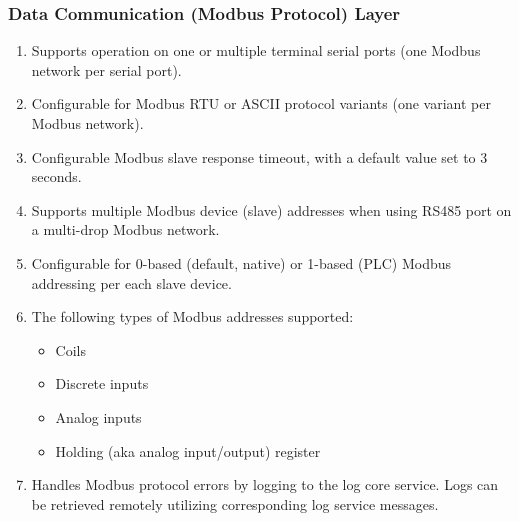 \documentclass[letterpaper,10pt,english]{sphinxmanual}
\begin{document}
\subsubsection{Data Communication (Modbus Protocol) Layer}
\label{\detokenize{funcspec:data-communication-modbus-protocol-layer}}\begin{enumerate}
\item {} 
Supports operation on one or multiple terminal serial ports (one Modbus network per serial port).

\item {} 
Configurable for Modbus RTU or ASCII protocol variants (one variant per Modbus network).

\item {} 
Configurable Modbus slave response timeout, with a default value set to 3 seconds.

\item {} 
Supports multiple Modbus device (slave) addresses when using RS485 port on a multi-drop Modbus network.

\item {} 
Configurable for 0-based (default, native) or 1-based (PLC) Modbus addressing per each slave device.

\item {} 
The following types of Modbus addresses supported:
\begin{itemize}
\item {} 
Coils

\item {} 
Discrete inputs

\item {} 
Analog inputs

\item {} 
Holding (aka analog input/output) register

\end{itemize}

\item {} 
Handles Modbus protocol errors by logging to the log core service. Logs can be retrieved remotely utilizing corresponding log service messages.

\end{enumerate}
\end{document}

